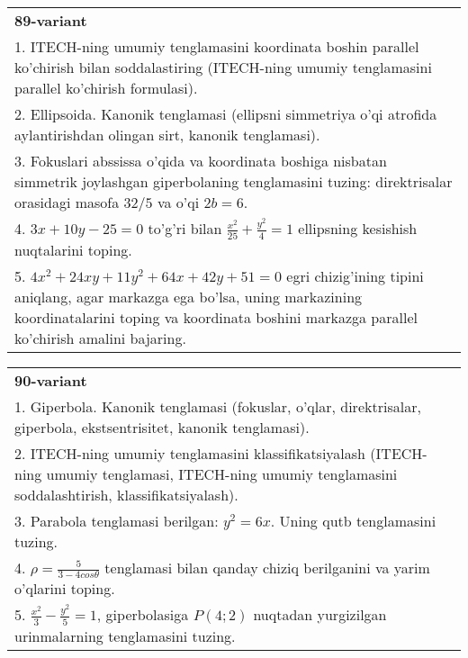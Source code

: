 \documentclass{article}
\begin{document}
\begin{tabular}{m{17cm}}
\textbf{89-variant}\\
1. ITECH-ning umumiy tenglamasini koordinata boshin parallel ko'chirish bilan soddalastiring (ITECH-ning umumiy tenglamasini parallel ko'chirish formulasi).\\

2. Ellipsoida. Kanonik tenglamasi (ellipsni simmetriya o'qi atrofida aylantirishdan olingan sirt, kanonik tenglamasi).\\

3. Fokuslari abssissa o'qida va koordinata boshiga nisbatan simmetrik joylashgan giperbolaning tenglamasini tuzing: direktrisalar orasidagi masofa $32/5$ va o'qi $2b=6$.\\

4. $3x + 10y - 25 = 0$ to'g'ri bilan $\frac{x^{2}}{25} + \frac{y^{2}}{4} = 1$ ellipsning kesishish nuqtalarini toping.  \\

5. $4x^{2} + 24xy + 11y^{2} + 64x + 42y + 51 = 0$ egri chizig'ining tipini aniqlang, agar markazga ega bo'lsa, uning markazining koordinatalarini toping va koordinata boshini markazga parallel ko'chirish amalini bajaring.
\end{tabular}
\vspace{1cm}


\begin{tabular}{m{17cm}}
\textbf{90-variant}\\
1. Giperbola. Kanonik tenglamasi (fokuslar, o'qlar, direktrisalar, giperbola, ekstsentrisitet, kanonik tenglamasi).\\

2. ITECH-ning umumiy tenglamasini klassifikatsiyalash (ITECH-ning umumiy tenglamasi, ITECH-ning umumiy tenglamasini soddalashtirish, klassifikatsiyalash).\\

3. Parabola tenglamasi berilgan: $y^2=6x$. Uning qutb tenglamasini tuzing.\\

4. $\rho = \frac{5}{3 - 4cos\theta}$ tenglamasi bilan qanday chiziq berilganini va yarim o'qlarini toping.  \\

5. $\frac{x^{2}}{3} - \frac{y^{2}}{5} = 1$, giperbolasiga $P(4;2)$ nuqtadan yurgizilgan urinmalarning tenglamasini tuzing.  
\end{tabular}
\vspace{1cm}
\end{document}
